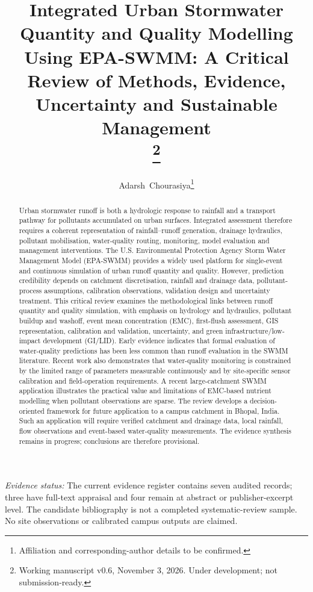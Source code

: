 \documentclass[journal]{IEEEtran}
\title{Integrated Urban Stormwater Quantity and Quality Modelling Using EPA-SWMM: A Critical Review of Methods, Evidence, Uncertainty and Sustainable Management\\\thanks{Working manuscript v0.6, November 3, 2026. Under development; not submission-ready.}}
\author{Adarsh~Chourasiya\thanks{Affiliation and corresponding-author details to be confirmed.}}
\begin{document}
\maketitle


\noindent\textit{Evidence status:} The current evidence register contains seven audited records; three have full-text appraisal and four remain at abstract or publisher-excerpt level. The candidate bibliography is not a completed systematic-review sample. No site observations or calibrated campus outputs are claimed.\n
\begin{abstract}
Urban stormwater runoff is both a hydrologic response to rainfall and a transport pathway for pollutants accumulated on urban surfaces. Integrated assessment therefore requires a coherent representation of rainfall--runoff generation, drainage hydraulics, pollutant mobilisation, water-quality routing, monitoring, model evaluation and management interventions. The U.S. Environmental Protection Agency Storm Water Management Model (EPA-SWMM) provides a widely used platform for single-event and continuous simulation of urban runoff quantity and quality. However, prediction credibility depends on catchment discretisation, rainfall and drainage data, pollutant-process assumptions, calibration observations, validation design and uncertainty treatment. This critical review examines the methodological links between runoff quantity and quality simulation, with emphasis on hydrology and hydraulics, pollutant buildup and washoff, event mean concentration (EMC), first-flush assessment, GIS representation, calibration and validation, uncertainty, and green infrastructure/low-impact development (GI/LID). Early evidence indicates that formal evaluation of water-quality predictions has been less common than runoff evaluation in the SWMM literature. Recent work also demonstrates that water-quality monitoring is constrained by the limited range of parameters measurable continuously and by site-specific sensor calibration and field-operation requirements. A recent large-catchment SWMM application illustrates the practical value and limitations of EMC-based nutrient modelling when pollutant observations are sparse. The review develops a decision-oriented framework for future application to a campus catchment in Bhopal, India. Such an application will require verified catchment and drainage data, local rainfall, flow observations and event-based water-quality measurements. The evidence synthesis remains in progress; conclusions are therefore provisional.
\end{abstract}
\end{document}
